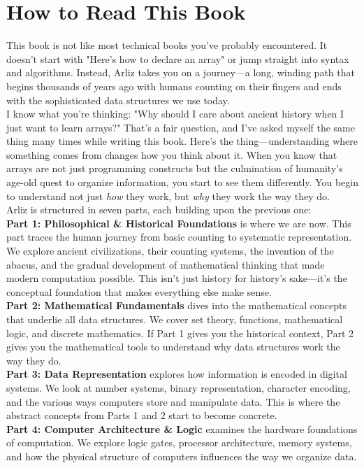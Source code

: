 \chapter*{How to Read This Book}

This book is not like most technical books you've probably encountered. It doesn't start with "Here's how to declare an array" or jump straight into syntax and algorithms. Instead, Arliz takes you on a journey—a long, winding path that begins thousands of years ago with humans counting on their fingers and ends with the sophisticated data structures we use today.\\
I know what you're thinking: "Why should I care about ancient history when I just want to learn arrays?" That's a fair question, and I've asked myself the same thing many times while writing this book. Here's the thing—understanding where something comes from changes how you think about it. When you know that arrays are not just programming constructs but the culmination of humanity's age-old quest to organize information, you start to see them differently. You begin to understand not just \emph{how} they work, but \emph{why} they work the way they do.\\
Arliz is structured in seven parts, each building upon the previous one:\\
\textbf{Part 1: Philosophical \& Historical Foundations} is where we are now. This part traces the human journey from basic counting to systematic representation. We explore ancient civilizations, their counting systems, the invention of the abacus, and the gradual development of mathematical thinking that made modern computation possible. This isn't just history for history's sake—it's the conceptual foundation that makes everything else make sense.\\
\textbf{Part 2: Mathematical Fundamentals} dives into the mathematical concepts that underlie all data structures. We cover set theory, functions, mathematical logic, and discrete mathematics. If Part 1 gives you the historical context, Part 2 gives you the mathematical tools to understand why data structures work the way they do.\\
\textbf{Part 3: Data Representation} explores how information is encoded in digital systems. We look at number systems, binary representation, character encoding, and the various ways computers store and manipulate data. This is where the abstract concepts from Parts 1 and 2 start to become concrete.\\
\textbf{Part 4: Computer Architecture \& Logic} examines the hardware foundations of computation. We explore logic gates, processor architecture, memory systems, and how the physical structure of computers influences the way we organize data.\\
